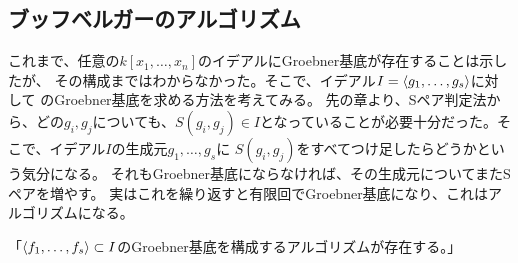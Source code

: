 \documentclass[9pt]{ltjsarticle}
\begin{document}
\subsection{ブッフベルガーのアルゴリズム}
\label{sub:ブッフベルガーのアルゴリズム}
これまで、任意の$k[x_1,\dots,x_n]$のイデアルにGroebner基底が存在することは示したが、
その構成まではわからなかった。そこで、イデアル$I=\left\langle g_1,\dots,g_s \right\rangle$に対して
のGroebner基底を求める方法を考えてみる。
先の章より、Sペア判定法から、どの$g_i,g_j$についても、$S(g_i,g_j) \in I$となっていることが必要十分だった。そこで、イデアル$I$の生成元$g_1,\dots,g_s$に
$S(g_i,g_j)$をすべてつけ足したらどうかという気分になる。
それもGroebner基底にならなければ、その生成元についてまたSペアを増やす。
実はこれを繰り返すと有限回でGroebner基底になり、これはアルゴリズムになる。

「$\left\langle f_1,\dots,f_s \right\rangle \subset I$のGroebner基底を構成するアルゴリズムが存在する。」
\end{document}
